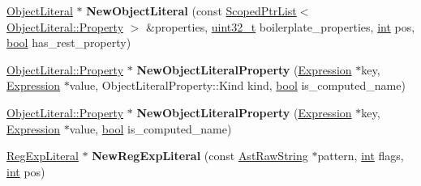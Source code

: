 \begin{DoxyCompactItemize}
\item 
\mbox{\label{classv8_1_1internal_1_1AstNodeFactory_a4f2eedb70930a54fc62453b1c5e85f3d}} 
\mbox{\hyperlink{classv8_1_1internal_1_1ObjectLiteral}{Object\+Literal}} $\ast$ {\bfseries New\+Object\+Literal} (const \mbox{\hyperlink{classv8_1_1internal_1_1ScopedPtrList}{Scoped\+Ptr\+List}}$<$ \mbox{\hyperlink{classv8_1_1internal_1_1ObjectLiteralProperty}{Object\+Literal\+::\+Property}} $>$ \&properties, \mbox{\hyperlink{classuint32__t}{uint32\+\_\+t}} boilerplate\+\_\+properties, \mbox{\hyperlink{classint}{int}} pos, \mbox{\hyperlink{classbool}{bool}} has\+\_\+rest\+\_\+property)
\item 
\mbox{\label{classv8_1_1internal_1_1AstNodeFactory_ae586017ae5548ccd3c43cc59e75c4a2f}} 
\mbox{\hyperlink{classv8_1_1internal_1_1ObjectLiteralProperty}{Object\+Literal\+::\+Property}} $\ast$ {\bfseries New\+Object\+Literal\+Property} (\mbox{\hyperlink{classv8_1_1internal_1_1Expression}{Expression}} $\ast$key, \mbox{\hyperlink{classv8_1_1internal_1_1Expression}{Expression}} $\ast$value, Object\+Literal\+Property\+::\+Kind kind, \mbox{\hyperlink{classbool}{bool}} is\+\_\+computed\+\_\+name)
\item 
\mbox{\label{classv8_1_1internal_1_1AstNodeFactory_a61d7182b4dd2fb50c431120706bc1596}} 
\mbox{\hyperlink{classv8_1_1internal_1_1ObjectLiteralProperty}{Object\+Literal\+::\+Property}} $\ast$ {\bfseries New\+Object\+Literal\+Property} (\mbox{\hyperlink{classv8_1_1internal_1_1Expression}{Expression}} $\ast$key, \mbox{\hyperlink{classv8_1_1internal_1_1Expression}{Expression}} $\ast$value, \mbox{\hyperlink{classbool}{bool}} is\+\_\+computed\+\_\+name)
\item 
\mbox{\label{classv8_1_1internal_1_1AstNodeFactory_adb19d770190f8d367905cf88e4523bcc}} 
\mbox{\hyperlink{classv8_1_1internal_1_1RegExpLiteral}{Reg\+Exp\+Literal}} $\ast$ {\bfseries New\+Reg\+Exp\+Literal} (const \mbox{\hyperlink{classv8_1_1internal_1_1AstRawString}{Ast\+Raw\+String}} $\ast$pattern, \mbox{\hyperlink{classint}{int}} flags, \mbox{\hyperlink{classint}{int}} pos)
\item 
\mbox{\label{classv8_1_1internal_1_1AstNodeFactory_a76104421e851259e72b4dc037831ff78}} 

\end{DoxyCompactItemize}

